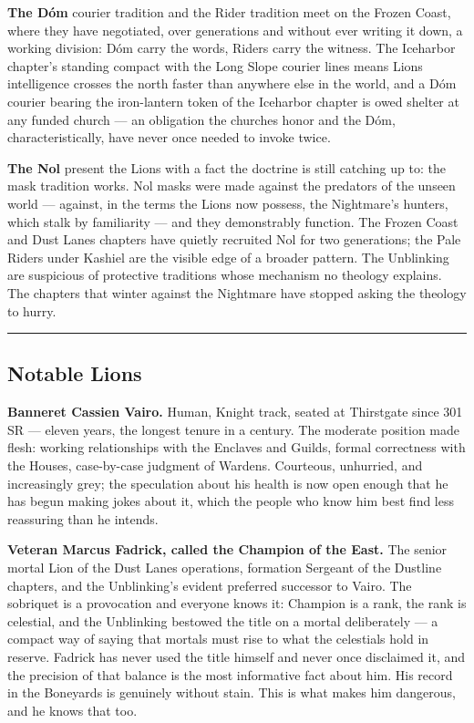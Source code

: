 \textbf{The Dóm} courier tradition and the Rider tradition meet on the Frozen Coast, where they have negotiated, over generations and without ever writing it down, a working division: Dóm carry the words, Riders carry the witness. The Iceharbor chapter's standing compact with the Long Slope courier lines means Lions intelligence crosses the north faster than anywhere else in the world, and a Dóm courier bearing the iron-lantern token of the Iceharbor chapter is owed shelter at any funded church --- an obligation the churches honor and the Dóm, characteristically, have never once needed to invoke twice.

\textbf{The Nol} present the Lions with a fact the doctrine is still catching up to: the mask tradition works. Nol masks were made against the predators of the unseen world --- against, in the terms the Lions now possess, the Nightmare's hunters, which stalk by familiarity --- and they demonstrably function. The Frozen Coast and Dust Lanes chapters have quietly recruited Nol for two generations; the Pale Riders under Kashiel are the visible edge of a broader pattern. The Unblinking are suspicious of protective traditions whose mechanism no theology explains. The chapters that winter against the Nightmare have stopped asking the theology to hurry.

\medskip\hrule\medskip

\subsection{Notable Lions}

\textbf{Banneret Cassien Vairo.} Human, Knight track, seated at Thirstgate since 301 SR --- eleven years, the longest tenure in a century. The moderate position made flesh: working relationships with the Enclaves and Guilds, formal correctness with the Houses, case-by-case judgment of Wardens. Courteous, unhurried, and increasingly grey; the speculation about his health is now open enough that he has begun making jokes about it, which the people who know him best find less reassuring than he intends.

\textbf{Veteran Marcus Fadrick, called the Champion of the East.} The senior mortal Lion of the Dust Lanes operations, formation Sergeant of the Dustline chapters, and the Unblinking's evident preferred successor to Vairo. The sobriquet is a provocation and everyone knows it: Champion is a rank, the rank is celestial, and the Unblinking bestowed the title on a mortal deliberately --- a compact way of saying that mortals must rise to what the celestials hold in reserve. Fadrick has never used the title himself and never once disclaimed it, and the precision of that balance is the most informative fact about him. His record in the Boneyards is genuinely without stain. This is what makes him dangerous, and he knows that too.

